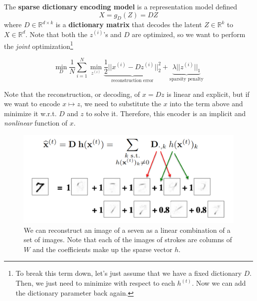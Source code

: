   \begin{definition}
    The \textbf{sparse dictionary encoding model} is a representation model defined 
    \begin{equation}
      X = g_{D}(Z) = D Z
    \end{equation}
    where $D \in \mathbb{R}^{d \times k}$ is a \textbf{dictionary matrix} that decodes the latent $Z \in \mathbb{R}^k$ to $X \in \mathbb{R}^d$. Note that both the $z^{(i)}$'s and $D$ are optimized, so we want to perform the \textit{joint} optimization\footnote{To break this term down, let's just assume that we have a fixed dictionary $D$. Then, we just need to minimize with respect to each $h^{(t)}$. Now we can add the dictionary parameter back again. }

    \begin{equation}
      \min_{D} \frac{1}{N} \sum_{i=1}^N \min_{z^{(i)}} \underbrace{\frac{1}{2} ||x^{(i)} - D z^{(i)}||_2^2}_{\text{reconstruction error}} + \underbrace{\lambda ||z^{(i)}||_1}_{\text{sparsity penalty}}
    \end{equation}
  \end{definition}

  Note that the reconstruction, or decoding, of $x = Dz$ is linear and explicit, but if we want to encode $x \mapsto z$, we need to substitute the $x$ into the term above and minimize it w.r.t. $D$ and $z$ to solve it. Therefore, this encoder is an implicit and \textit{nonlinear} function of $x$. 

  \begin{figure}[H]
    \centering 
    \includegraphics[scale=0.4]{img/sparse_coding.png}
    \caption{We can reconstruct an image of a seven as a linear combination of a set of images. Note that each of the images of strokes are columns of $W$ and the coefficients make up the sparse vector $h$. } 
    \label{fig:sparse_coding}
  \end{figure}

